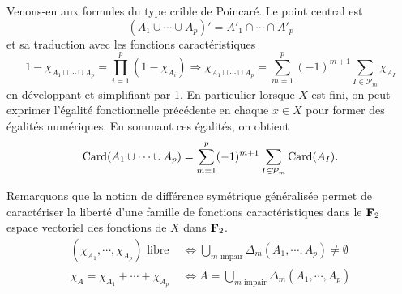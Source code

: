 \noindent Venons-en aux formules du type crible de Poincaré. Le point central est
\begin{displaymath}
  (A_1 \cup \cdots \cup A_p)' = A'_1 \cap \cdots \cap A'_p
\end{displaymath}
et sa traduction avec les fonctions caractéristiques
\begin{displaymath}
  1 - \chi_{A_1 \cup \cdots \cup A_p} = \prod_{i=1}^p(1 - \chi_{A_i})
  \Rightarrow
  \chi_{A_1 \cup \cdots \cup A_p} = \sum_{m=1}^p (-1)^{m+1}\sum_{I \in \mathcal{P}_m}\chi_{A_I}
\end{displaymath}
en développant et simplifiant par 1.\newline
En particulier lorsque $X$ est fini, on peut exprimer l'égalité fonctionnelle précédente en chaque $x\in X$ pour former des égalités numériques. En sommant ces égalités, on obtient
\begin{displaymath}
  \mathop{\mathrm{Card}}(A_1 \cup \cdots \cup A_p) = \sum_{m=1}^p (-1)^{m+1}\sum_{I \in \mathcal{P}_m}\mathop{\mathrm{Card}}(A_I).
\end{displaymath}


\noindent Remarquons que la notion de différence symétrique généralisée permet de caractériser la liberté d'une famille de fonctions caractéristiques dans le $\mathbf{F}_2$ espace vectoriel des fonctions de $X$ dans $\mathbf{F}_2$.
\begin{align*}
  (\chi_{A_1}, \cdots, \chi_{A_p}) \text{ libre } &\Leftrightarrow \bigcup_{m \text{ impair}} \Delta_m(A_1, \cdots, A_p) \not = \emptyset \\
  \chi_A = \chi_{A_1} + \cdots + \chi_{A_p} &\Leftrightarrow A = \bigcup_{m \text{ impair}} \Delta_m(A_1, \cdots, A_p)
\end{align*}


